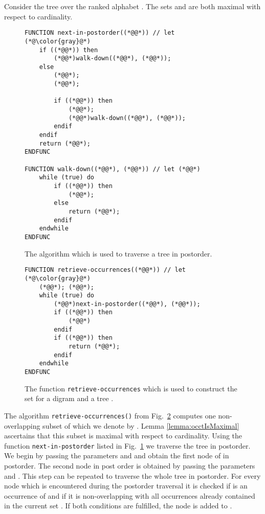\documentclass[12pt]{llncs}
\newcommand{\tp}{digram\xspace}
\begin{document}
\begin{example}
Consider the tree  over the ranked alphabet . The sets  and  are both maximal with respect to cardinality.
\end{example}
\begin{figure}[tb]
\begin{lstlisting}
FUNCTION next-in-postorder((*@@*)) // let (*@\color{gray}@*)
	if ((*@@*)) then
		(*@@*)walk-down((*@@*), (*@@*));
	else	
		(*@@*);
		(*@@*);
		
		if ((*@@*)) then
			(*@@*);
			(*@@*)walk-down((*@@*), (*@@*));	
		endif
	endif
	return (*@@*);
ENDFUNC

FUNCTION walk-down((*@@*), (*@@*)) // let (*@@*)
	while (true) do
		if ((*@@*)) then
			(*@@*);
		else
			return (*@@*);
		endif
	endwhile
ENDFUNC
\end{lstlisting}
	\caption{The algorithm which is used to traverse a tree in postorder.}\label{lst:traversalAlgorithm}
\end{figure}
\begin{figure}[tb]
	\begin{lstlisting}
FUNCTION retrieve-occurrences((*@@*)) // let (*@\color{gray}@*)
	(*@@*); (*@@*);
	while (true) do
		(*@@*)next-in-postorder((*@@*), (*@@*));
		if ((*@@*)) then
			(*@@*)
		endif
		if ((*@@*)) then
			return (*@@*);
		endif
	endwhile
ENDFUNC
	\end{lstlisting}
	\caption{The function \texttt{retrieve-occurrences} which is used to construct the set  for a \tp  and a tree .}\label{lst:functionRetrieveOccurrences}
\end{figure}
The algorithm \texttt{retrieve-occurrences()}
from Fig.~\ref{lst:functionRetrieveOccurrences} computes one non-over\-lapping subset of  which we denote by . Lemma \ref{lemma:occtIsMaximal} ascertains that this subset is maximal with respect to cardinality.
Using the function \verb|next-in-postorder| listed in Fig.~\ref{lst:traversalAlgorithm} we traverse the tree  in postorder. We begin by passing the parameters  and  and obtain the first node  of  in postorder. The second node in post order is obtained by passing the parameters  and . This step can be repeated to traverse the whole tree  in postorder.
For every node  which is encountered during the postorder traversal it is checked if  is an occurrence of  and if it is non-overlapping with all occurrences already contained in the current set . If both conditions are fulfilled, the node  is added to . 
\end{document}
